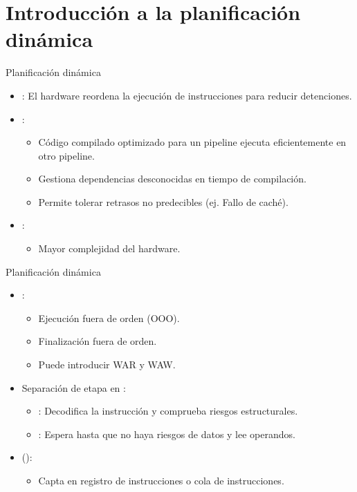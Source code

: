 \section{Introducción a la planificación dinámica}

\begin{frame}[t]{Planificación dinámica}
\begin{itemize}
  \item {}: El hardware reordena la ejecución de instrucciones para reducir detenciones.

  \item {}:
    \begin{itemize}
      \item Código compilado optimizado para un pipeline ejecuta eficientemente en otro pipeline.
      \item Gestiona dependencias desconocidas en tiempo de compilación.
      \item Permite tolerar retrasos no predecibles (ej. Fallo de caché).
    \end{itemize}

  \item {}:
    \begin{itemize}
      \item Mayor complejidad del hardware.
    \end{itemize}
\end{itemize}
\end{frame}

\begin{frame}[t]{Planificación dinámica}
\begin{itemize}
  \item {}:
    \begin{itemize}
      \item Ejecución fuera de orden (OOO).
      \item Finalización fuera de orden.
      \item Puede introducir  WAR y WAW.
    \end{itemize}

  \item Separación de etapa  en :
    \begin{itemize}
      \item {}: Decodifica la instrucción y comprueba riesgos estructurales.
      \item {}: Espera hasta que no haya riesgos de datos y lee operandos.
    \end{itemize}

  \item {} ():
    \begin{itemize}
      \item Capta en registro de instrucciones o cola de instrucciones.
    \end{itemize}
\end{itemize}
\end{frame}

